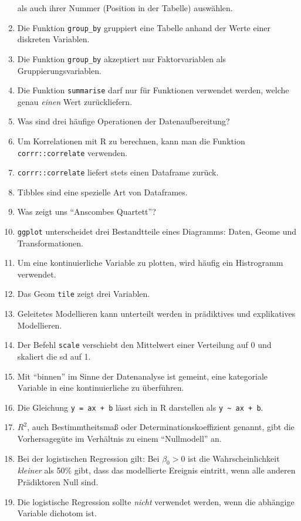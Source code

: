 \documentclass[12pt,ngerman,]{book}
\begin{document}
\begin{enumerate}
  als auch ihrer Nummer (Position in der Tabelle) auswählen.
\item
  Die Funktion \texttt{group\_by} gruppiert eine Tabelle anhand der
  Werte einer diskreten Variablen.
\item
  Die Funktion \texttt{group\_by} akzeptiert nur Faktorvariablen als
  Gruppierungsvariablen.
\item
  Die Funktion \texttt{summarise} darf nur für Funktionen verwendet
  werden, welche genau \emph{einen} Wert zurückliefern.
\item
  Was sind drei häufige Operationen der Datenaufbereitung?
\item
  Um Korrelationen mit R zu berechnen, kann man die Funktion
  \texttt{corrr::correlate} verwenden.
\item
  \texttt{corrr::correlate} liefert stets einen Dataframe zurück.
\item
  Tibbles sind eine spezielle Art von Dataframes.
\item
  Was zeigt uns ``Anscombes Quartett''?
\item
  \texttt{ggplot} unterscheidet drei Bestandtteile eines Diagramms:
  Daten, Geome und Transformationen.
\item
  Um eine kontinuierliche Variable zu plotten, wird häufig ein
  Histrogramm verwendet.
\item
  Das Geom \texttt{tile} zeigt drei Variablen.
\item
  Geleitetes Modellieren kann unterteilt werden in prädiktives und
  explikatives Modellieren.
\item
  Der Befehl \texttt{scale} verschiebt den Mittelwert einer Verteilung
  auf 0 und skaliert die sd auf 1.
\item
  Mit ``binnen'' im Sinne der Datenanalyse ist gemeint, eine kategoriale
  Variable in eine kontinuierliche zu überführen.
\item
  Die Gleichung \texttt{y\ =\ ax\ +\ b} lässt sich in R darstellen als
  \texttt{y\ \textasciitilde{}\ ax\ +\ b}.
\item
  \(R^2\), auch Bestimmtheitsmaß oder Determinationskoeffizient genannt,
  gibt die Vorhersagegüte im Verhältnis zu einem ``Nullmodell'' an.
\item
  Bei der logistischen Regression gilt: Bei \(\beta_0>0\) ist die
  Wahrscheinlichkeit \emph{kleiner} als 50\% gibt, dass das modellierte
  Ereignis eintritt, wenn alle anderen Prädiktoren Null sind.
\item
  Die logistische Regression sollte \emph{nicht} verwendet werden, wenn
  die abhängige Variable dichotom ist.
\end{enumerate}
\end{document}
